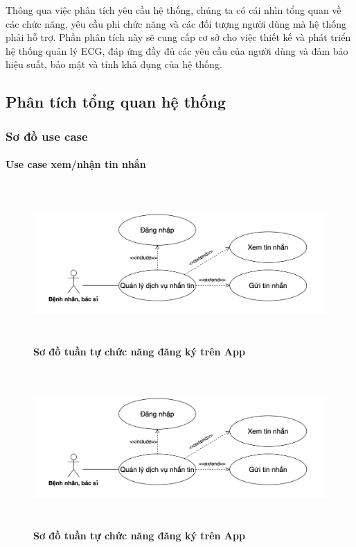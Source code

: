 \documentclass{article}%
\begin{document}
Thông qua việc phân tích yêu cầu hệ thống, chúng ta có cái nhìn tổng quan về các chức năng, yêu cầu phi chức năng và các đối tượng người dùng mà hệ thống phải hỗ trợ. Phần phân tích này sẽ cung cấp cơ sở cho việc thiết kế và phát triển hệ thống quản lý ECG, đáp ứng đầy đủ các yêu cầu của người dùng và đảm bảo hiệu suất, bảo mật và tính khả dụng của hệ thống.
\subsection{Phân tích tổng quan hệ thống}



\subsubsection{Sơ đồ use case}

\paragraph{Use case xem/nhận tin nhắn}
\mbox{}

  \begin{figure}[H]
    \centering
    \includegraphics[width=15cm,height=6cm]{Images/mobile_app/use_case_send_receive_message.png}
    \caption[Sơ đồ tuần tự chức năng đăng ký trên App]{\bfseries \fontsize{12pt}{0pt}
    \selectfont Sơ đồ tuần tự chức năng đăng ký trên App}
    \label{hinh21} %
  \end{figure}

  \begin{figure}[H]
    \centering
    \includegraphics[width=15cm,height=6cm]{Images/mobile_app/use_case_send_receive_message.png}
    \caption[Sơ đồ tuần tự chức năng đăng ký trên App]{\bfseries \fontsize{12pt}{0pt}
    \selectfont Sơ đồ tuần tự chức năng đăng ký trên App}
    \label{hinh21} %
  \end{figure}
\end{document}
